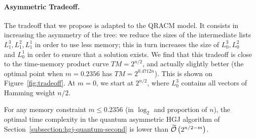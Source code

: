 
\paragraph{Asymmetric Tradeoff.}
The tradeoff that we propose is adapted to the QRACM model. It consists in increasing the asymmetry of the tree: we reduce the sizes of the intermediate lists $L_1^3, L_1^2, L_1^1$ in order to use less memory; this in turn increases the size of $L^3_0, L^2_0$ and $L^1_0$ in order to ensure that a solution exists. We find that this tradeoff is close to the time-memory product curve $T M = 2^{n/2}$, and actually slightly better (the optimal point when $m = 0.2356$ has $T M = 2^{0.4712 n}$). This is shown on Figure~\ref{fig:tradeoff}. At $m = 0$, we start at $2^{n/2}$, where $L_0^3$ contains all vectors of Hamming weight $n/2$.


\begin{fact}
For any memory constraint $m \leq 0.2356$ (in $\log_2$ and proportion of $n$), the optimal time complexity in the quantum asymmetric HGJ algorithm of Section~\ref{subsection:hgj-quantum-second} is lower than $\widetilde{\mathcal{O}} \left(2^{n/2 - m} \right)$.
\end{fact}



